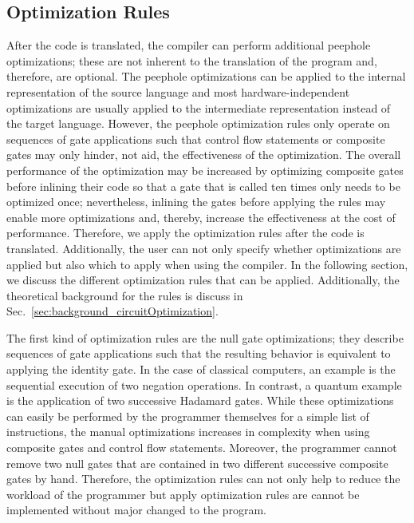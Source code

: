 \subsection{Optimization Rules}
After the code is translated, the compiler can perform additional peephole optimizations; these are not inherent to the translation of the program and, therefore, are optional. 
The peephole optimizations can be applied to the internal representation of the source language and most hardware-independent optimizations are usually applied to the intermediate representation instead of the target language. However, the peephole optimization rules only operate on sequences of gate applications such that control flow statements or composite gates may only hinder, not aid, the effectiveness of the optimization. The overall performance of the optimization may be increased by optimizing composite gates before inlining their code so that a gate that is called ten times only needs to be optimized once; nevertheless, inlining the gates before applying the rules may enable more optimizations and, thereby, increase the effectiveness at the cost of performance. Therefore, we apply the optimization rules after the code is translated.
Additionally, the user can not only specify whether optimizations are applied but also which to apply when using the compiler. In the following section, we discuss the different optimization rules that can be applied. Additionally, the theoretical background for the rules is discuss in Sec.~\ref{sec:background_circuitOptimization}.

The first kind of optimization rules are the null gate optimizations; they describe sequences of gate applications such that the resulting behavior is equivalent to applying the identity gate. In the case of classical computers, an example is the sequential execution of two negation operations. In contrast, a quantum example is the application of two successive Hadamard gates. While these optimizations can easily be performed by the programmer themselves for a simple list of instructions, the manual optimizations increases in complexity when using composite gates and control flow statements. Moreover, the programmer cannot remove two null gates that are contained in two different successive composite gates by hand. Therefore, the optimization rules can not only help to reduce the workload of the programmer but apply optimization rules are cannot be implemented without major changed to the program.

